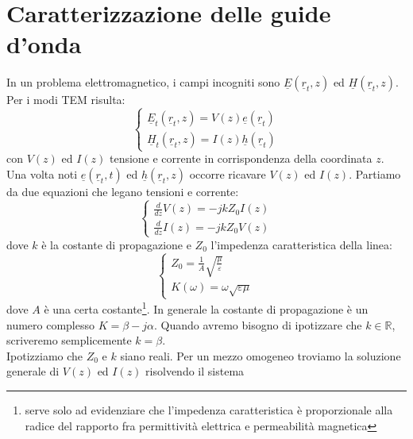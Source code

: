 \documentclass{book}
\begin{document}
    \section{Caratterizzazione delle guide d'onda}
        In un problema elettromagnetico, i campi incogniti sono $\underline{E}(\underline{r}_{t}, z)$ ed $\underline{H}(\underline{r}_{t}, z)$.
        Per i modi TEM risulta:
        \begin{equation}
            \begin{cases}
                \underline{E}_{t}(\underline{r}_{t},z)=V(z)\underline{e}(\underline{r}_{t}) \\
                \underline{H}_{t}(\underline{r}_{t},z)=I(z)\underline{h}(\underline{r}_{t})
            \end{cases}
        \end{equation}
        con $V(z)$ ed $I(z)$ tensione e corrente in corrispondenza della coordinata $z$. Una volta noti $\underline{e}(\underline{r}_{t}, t)$
        ed $\underline{h}(\underline{r}_{t},z)$ occorre ricavare $V(z)$ ed $I(z)$. Partiamo da due equazioni che legano tensioni e corrente:
        \begin{equation}
            \label{eqn:eq_tensione_corrente}
            \begin{cases}
                \frac{d}{dz}V(z)=-j k Z_{0}I(z) \\
                \frac{d}{dz}I(z) = -j k Z_{0}V(z)
            \end{cases}
        \end{equation}
        dove $k$ è la costante di propagazione e $Z_{0}$ l'impedenza caratteristica della linea:
        \begin{equation}
            \begin{cases}
                Z_{0} = \displaystyle \frac{1}{A} \sqrt{\frac{\mu}{\varepsilon}} \\
                K(\omega)= \omega \sqrt{\varepsilon \mu}
            \end{cases}
        \end{equation}
        dove $A$ è una certa costante\footnote{serve solo ad evidenziare che l'impedenza caratteristica è proporzionale alla radice del rapporto
        fra permittività elettrica e permeabilità magnetica}. In generale la costante di propagazione è un numero complesso $K=\beta -j \alpha$. Quando
        avremo bisogno di ipotizzare che $k \in \mathbb{R}$, scriveremo semplicemente $k=\beta$. \\
        Ipotizziamo che $Z_{0}$ e $k$ siano reali. Per un mezzo omogeneo troviamo la soluzione generale di $V(z)$ ed $I(z)$ risolvendo il sistema
\end{document}
